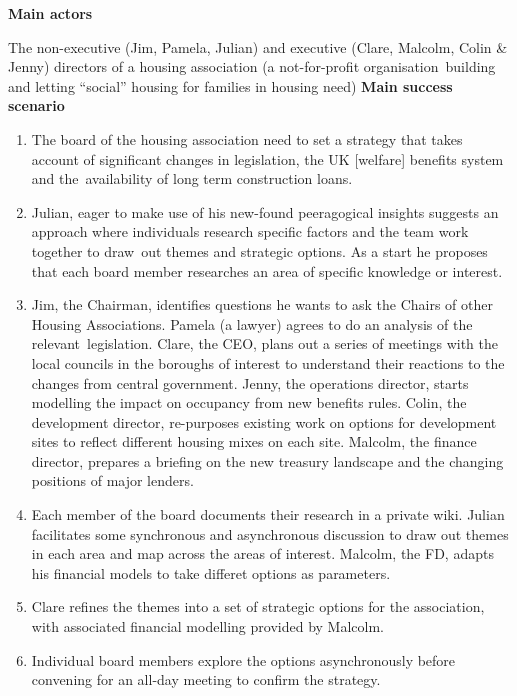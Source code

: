 \textbf{Main actors}

The non-executive (Jim, Pamela, Julian) and executive (Clare, Malcolm,
Colin \& Jenny) directors of a housing association (a not-for-profit
organisation~building and letting ``social'' housing for families in
housing need) \textbf{Main success scenario}

\begin{enumerate}
\item
  The board of the housing association need to set a strategy that takes
  account of significant changes in legislation, the UK {[}welfare{]}
  benefits system and the~availability of long term construction loans.
\item
  Julian, eager to make use of his new-found peeragogical insights
  suggests an approach where individuals research specific factors and
  the team work together to draw~out themes and strategic options. As a
  start he proposes that each board member researches an area of
  specific knowledge or interest.
\item
  Jim, the Chairman, identifies questions he wants to ask the Chairs of
  other Housing Associations. Pamela (a lawyer) agrees to do an analysis
  of the relevant~legislation. Clare, the CEO, plans out a series of
  meetings with the local councils in the boroughs of interest to
  understand their reactions to the changes from central government.
  Jenny, the operations director, starts modelling the impact on
  occupancy from new benefits rules. Colin, the development director,
  re-purposes existing work on options for development sites to reflect
  different housing mixes on each site. Malcolm, the finance director,
  prepares a briefing on the new treasury landscape and the changing
  positions of major lenders.
\item
  Each member of the board documents their research in a private wiki.
  Julian facilitates some synchronous and asynchronous discussion to
  draw out themes in each area and map across the areas of interest.
  Malcolm, the FD, adapts his financial models to take differet options
  as parameters.
\item
  Clare refines the themes into a set of strategic options for the
  association, with associated financial modelling provided by Malcolm.
\item
  Individual board members explore the options asynchronously before
  convening for an all-day meeting to confirm the strategy.
\end{enumerate}

